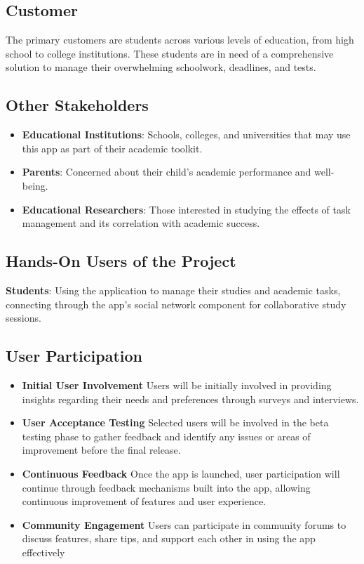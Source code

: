 \documentclass[12pt]{article}
\begin{document}
\subsection{Customer}
The primary customers are students across various levels of education, from high school to college institutions. These students are in need of a comprehensive solution to manage their overwhelming schoolwork, deadlines, and tests.
\subsection{Other Stakeholders}
\begin{itemize}
  \item \textbf{Educational Institutions}: Schools, colleges, and universities that may use this app as part of their academic toolkit.
  \item \textbf{Parents}: Concerned about their child's academic performance and well-being.
  \item \textbf{Educational Researchers}: Those interested in studying the effects of task management and its correlation with academic success.
\end{itemize}

\subsection{Hands-On Users of the Project}
\textbf{Students}: Using the application to manage their studies and academic tasks, connecting through the app's social network component for collaborative study sessions.
\subsection{User Participation}
\begin{itemize}
  \item \textbf{Initial User Involvement}
  Users will be initially involved in providing insights regarding their needs and preferences through surveys and interviews. 
  \item \textbf{User Acceptance Testing}
  Selected users will be involved in the beta testing phase to gather feedback and identify any issues or areas of improvement before the final release.
  \item \textbf{Continuous Feedback}
  Once the app is launched, user participation will continue through feedback mechanisms built into the app, allowing continuous improvement of features and user experience.
  \item \textbf{Community Engagement}
  Users can participate in community forums to discuss features, share tips, and support each other in using the app effectively
\end{itemize}
\end{document}
